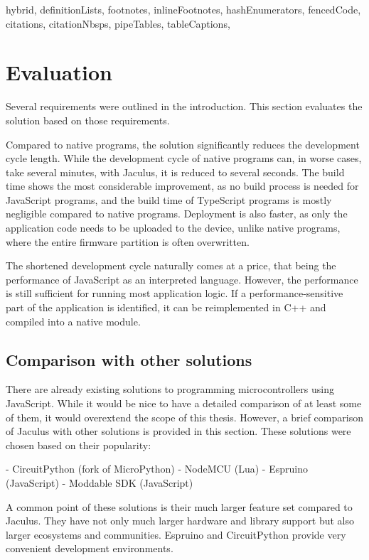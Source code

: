 \begin{markdown*}{%
  hybrid,
  definitionLists,
  footnotes,
  inlineFootnotes,
  hashEnumerators,
  fencedCode,
  citations,
  citationNbsps,
  pipeTables,
  tableCaptions,
}


\chapter{Evaluation}

Several requirements were outlined in the introduction. This section evaluates the solution based on those requirements.

Compared to native programs, the solution significantly reduces the development cycle length. While the development cycle of native programs can, in worse cases, take several minutes, with Jaculus, it is reduced to several seconds. The build time shows the most considerable improvement, as no build process is needed for JavaScript programs, and the build time of TypeScript programs is mostly negligible compared to native programs. Deployment is also faster, as only the application code needs to be uploaded to the device, unlike native programs, where the entire firmware partition is often overwritten.

The shortened development cycle naturally comes at a price, that being the performance of JavaScript as an interpreted language. However, the performance is still sufficient for running most application logic. If a performance-sensitive part of the application is identified, it can be reimplemented in C++ and compiled into a native module.

\section{Comparison with other solutions}

There are already existing solutions to programming microcontrollers using JavaScript. While it would be nice to have a detailed comparison of at least some of them, it would overextend the scope of this thesis. However, a brief comparison of Jaculus with other solutions is provided in this section. These solutions were chosen based on their popularity:

- CircuitPython (fork of MicroPython)
- NodeMCU (Lua)
- Espruino (JavaScript)
- Moddable SDK (JavaScript)

A common point of these solutions is their much larger feature set compared to Jaculus. They have not only much larger hardware and library support but also larger ecosystems and communities. Espruino and CircuitPython provide very convenient development environments.


\end{markdown*}
